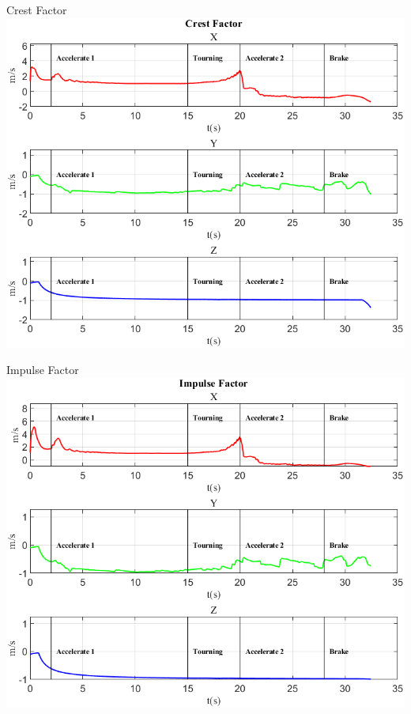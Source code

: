\documentclass[beamer]{standalone}
\begin{document}
%	
	
	
	\begin{frame}{{Crest Factor}}
		\centering\includegraphics[height=.8\textheight]{figure/Vel/Crest Factor}
	\end{frame}
	
	\begin{frame}{{Impulse Factor}}
		\centering\includegraphics[height=.8\textheight]{figure/Vel/Impulse Factor}
	\end{frame}
	
\end{document}
